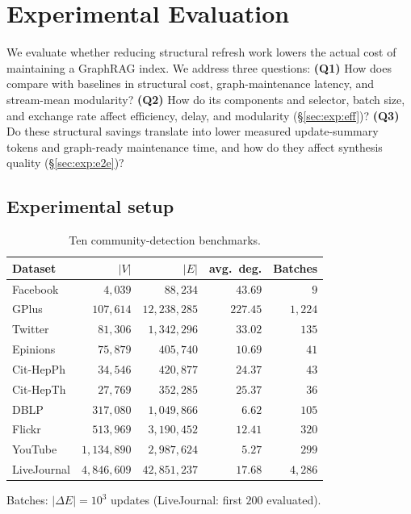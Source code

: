 \section{Experimental Evaluation}
\label{sec:exp}

We evaluate whether reducing structural refresh work lowers the actual cost
of maintaining a GraphRAG index. We address three questions:
\textbf{(Q1)} How does \DyLo{} compare with baselines in structural cost,
graph-maintenance latency, and stream-mean modularity?
\textbf{(Q2)} How do its components and selector, batch size, and exchange
rate affect efficiency, delay, and modularity (\S\ref{sec:exp:eff})?
\textbf{(Q3)} Do these structural savings translate into lower measured
update-summary tokens and graph-ready maintenance time, and how do they affect
synthesis quality (\S\ref{sec:exp:e2e})?

\subsection{Experimental setup}
\label{sec:exp:setup}

\begin{table}[b]\centering
\caption{Ten community-detection benchmarks.}
\label{tab:datasets}
\begin{footnotesize}
\setlength{\tabcolsep}{0.4em}
\begin{tabular}{lrrrr}
\toprule
Dataset & $|V|$ & $|E|$ & avg.\ deg. & Batches \\
\midrule
Facebook    & $4{,}039$     & $88{,}234$      & $43.69$  & $9$ \\
GPlus       & $107{,}614$   & $12{,}238{,}285$& $227.45$ & $1{,}224$ \\
Twitter     & $81{,}306$    & $1{,}342{,}296$ & $33.02$  & $135$ \\
Epinions    & $75{,}879$    & $405{,}740$     & $10.69$  & $41$ \\
Cit-HepPh   & $34{,}546$    & $420{,}877$     & $24.37$  & $43$ \\
Cit-HepTh   & $27{,}769$    & $352{,}285$     & $25.37$  & $36$ \\
DBLP        & $317{,}080$   & $1{,}049{,}866$ & $6.62$   & $105$ \\
Flickr      & $513{,}969$   & $3{,}190{,}452$ & $12.41$  & $320$ \\
YouTube     & $1{,}134{,}890$&$2{,}987{,}624$ & $5.27$   & $299$ \\
LiveJournal & $4{,}846{,}609$&$42{,}851{,}237$& $17.68$  & $4{,}286$ \\
\bottomrule
\end{tabular}
\par\smallskip\raggedright
Batches: $|\Delta E|=10^3$ updates
(LiveJournal: first $200$ evaluated).
\end{footnotesize}
\end{table}


